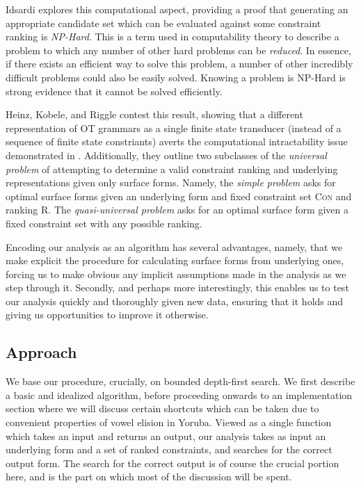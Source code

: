 \documentclass[12pt]{article}
\begin{document}
Idsardi \cite{idsardi2006simple} explores this computational aspect, providing
a proof that generating an appropriate candidate set which can be evaluated
against some constraint ranking is \textit{NP-Hard}. This is a term used in
computability theory to describe a problem to which any number of other hard
problems can be \textit{reduced}. In essence, if there exists an efficient way
to solve this problem, a number of other incredibly difficult problems could
also be easily solved. Knowing a problem is NP-Hard is strong evidence that it
cannot be solved efficiently.

Heinz, Kobele, and Riggle \cite{heinz2009evaluating} contest this result,
showing that a different representation of \textsc{OT} grammars as a single
finite state transducer (instead of a sequence of finite state constriants)
averts the computational intractability issue demonstrated in
\cite{idsardi2006simple}. Additionally, they outline two subclasses of the
\textit{universal problem} of attempting to determine a valid constraint
ranking and underlying representations given only surface forms. Namely,
the \textit{simple problem} asks for optimal surface forms given an underlying
form and fixed constraint set \textsc{Con} and ranking \textsc{R}. The
\textit{quasi-universal problem} asks for an optimal surface form given
a fixed constraint set with any possible ranking.

Encoding our analysis as an algorithm has several advantages, namely, that we
make explicit the procedure for calculating surface forms from underlying ones,
forcing us to make obvious any implicit assumptions made in the analysis as we
step through it. Secondly, and perhaps more interestingly, this enables us to
test our analysis quickly and thoroughly given new data, ensuring that it holds
and giving us opportunities to improve it otherwise.

\subsection{Approach}
\label{subsec:approach}

We base our procedure, crucially, on bounded depth-first search. We first
describe a basic and idealized algorithm, before proceeding onwards to an
implementation section where we will discuss certain shortcuts which can be
taken due to convenient properties of vowel elision in Yoruba. Viewed as a
single function which takes an input and returns an output, our analysis 
takes as input an underlying form and a set of ranked constraints, and
searches for the correct output form. The search for the correct output is
of course the crucial portion here, and is the part on which most of the
discussion will be spent.
\end{document}
